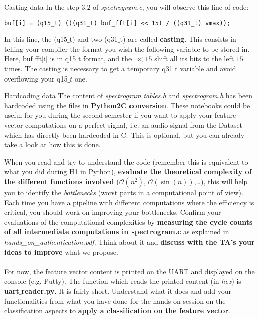 \begin{bclogo}[couleur = gray!20, arrondi = 0.2, logo=\bcinfo]{Casting data}
%
In the step $3.2$ of \emph{spectrogram.c}, you will observe this line of code:
%
\begin{lstlisting}
buf[i] = (q15_t) (((q31_t) buf_fft[i] << 15) / ((q31_t) vmax));
\end{lstlisting}
%
In this line, the (q15$\_$t) and two (q31$\_$t) are called \textbf{casting}. This consists in telling your compiler the format you wish the following variable to be stored in. Here, buf$\_$fft[i] is in q15$\_$t format, and the $\ll 15$ shift all its bits to the left $15$ times. The casting is necessary to get a temporary q31$\_$t variable and avoid overflowing your q15$\_t$ one.
%
\end{bclogo}
%
\begin{bclogo}[couleur = gray!20, arrondi = 0.2, logo=\bcinfo]{Hardcoding data}
The content of \emph{spectrogram$\_$tables.h} and \emph{spectrogram.h} has been hardcoded using the files in \textbf{Python2C$\_$conversion}. These notebooks could be useful for you during the second semester if you want to apply your feature vector computations on a perfect signal, i.e. an audio signal from the Dataset which has directly been hardcoded in C. This is optional, but you can already take a look at how this is done.
\end{bclogo}
%
When you read and try to understand the code (remember this is equivalent to what you did during H1 in Python), \textbf{evaluate the theoretical complexity of the different functions involved} ($\mathcal O(n^2)$, $\mathcal O(\sin (n))$,\ldots), this will help you to identify the \emph{bottlenecks} (worst parts in a computational point of view). Each time you have a pipeline with different computations where the efficiency is critical, you should work on improving your bottlenecks. Confirm your evaluations of the computational complexities by \textbf{measuring the cycle counts of all intermediate computations in spectrogram.c} as explained in \emph{hands\_on\_authentication.pdf}.
Think about it and \textbf{discuss with the TA's your ideas to improve} what we propose. \\
\\
For now, the feature vector content is printed on the UART and displayed on the console (e.g. Putty). The function which reads the printed content (in \emph{hex}) is \textbf{uart$\_$reader.py}. It is fairly short. Understand what it does and add your functionalities from what you have done for the hands-on session on the classification aspects to \textbf{apply a classification on the feature vector}. \\
